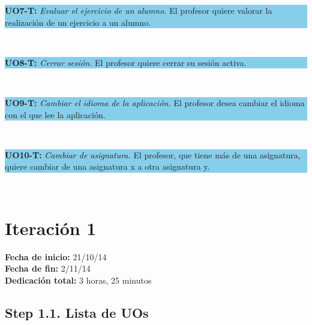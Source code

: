 \vspace{0.1cm}

\colorbox{SkyBlue}{\parbox[c]{1.0\textwidth}{
\textbf{UO7-T:} \textit{Evaluar el ejercicio de un alumno.} El profesor quiere valorar la realización de un ejercicio a un alumno.\\
}}\\

\vspace{0.1cm}

\colorbox{SkyBlue}{\parbox[c]{1.0\textwidth}{
\textbf{UO8-T:} \textit{Cerrar sesión.} El profesor quiere cerrar su sesión activa.\\
}}\\

\vspace{0.1cm}

\colorbox{SkyBlue}{\parbox[c]{1.0\textwidth}{
\textbf{UO9-T:} \textit{Cambiar el idioma de la aplicación.} El profesor desea cambiar el idioma con el que lee la aplicación.\\
}}\\

\vspace{0.1cm}

\colorbox{SkyBlue}{\parbox[c]{1.0\textwidth}{
\textbf{UO10-T:} \textit{Cambiar de asignatura.} El profesor, que tiene más de una asignatura, quiere cambiar de una asignatura x a otra asignatura y.\\
}}\\


\section{Iteración 1}
\label{it1}

\begin{flushleft}
\textbf{Fecha de inicio:} 21/10/14\\
\textbf{Fecha de fin:} 2/11/14\\
\textbf{Dedicación total:} 3 horas, 25 minutos\\
\end{flushleft}

\subsection{Step 1.1. Lista de UOs}
\label{it1:1.1}

